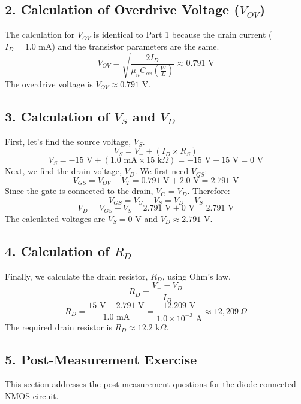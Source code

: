 \documentclass{article}
\begin{document}
\subsection*{2. Calculation of Overdrive Voltage ($V_{OV}$)}
The calculation for $V_{OV}$ is identical to Part 1 because the drain current ($I_D = 1.0 \text{ mA}$) and the transistor parameters are the same.
\[ V_{OV} = \sqrt{\frac{2 I_D}{\mu_n C_{ox} \left(\frac{W}{L}\right)}} \approx 0.791 \text{ V} \]
The overdrive voltage is \textbf{$V_{OV} \approx 0.791 \text{ V}$}.

\subsection*{3. Calculation of $V_S$ and $V_D$}
First, let's find the source voltage, $V_S$.
\[ V_S = V_{-} + (I_D \times R_S) \]
\[ V_S = -15 \text{ V} + (1.0 \text{ mA} \times 15 \text{ k}\Omega) = -15 \text{ V} + 15 \text{ V} = 0 \text{ V} \]
Next, we find the drain voltage, $V_D$. We first need $V_{GS}$:
\[ V_{GS} = V_{OV} + V_T = 0.791 \text{ V} + 2.0 \text{ V} = 2.791 \text{ V} \]
Since the gate is connected to the drain, $V_G = V_D$. Therefore:
\[ V_{GS} = V_G - V_S = V_D - V_S \]
\[ V_D = V_{GS} + V_S = 2.791 \text{ V} + 0 \text{ V} = 2.791 \text{ V} \]
The calculated voltages are \textbf{$V_S = 0 \text{ V}$} and \textbf{$V_D \approx 2.791 \text{ V}$}.

\subsection*{4. Calculation of $R_D$}
Finally, we calculate the drain resistor, $R_D$, using Ohm's law.
\[ R_D = \frac{V_{+} - V_D}{I_D} \]
\[ R_D = \frac{15 \text{ V} - 2.791 \text{ V}}{1.0 \text{ mA}} = \frac{12.209 \text{ V}}{1.0 \times 10^{-3} \text{ A}} \approx 12,209 \ \Omega \]
The required drain resistor is \textbf{$R_D \approx 12.2 \text{ k}\Omega$}.

\subsection*{5. Post-Measurement Exercise}
This section addresses the post-measurement questions for the diode-connected
NMOS circuit.
\end{document}
